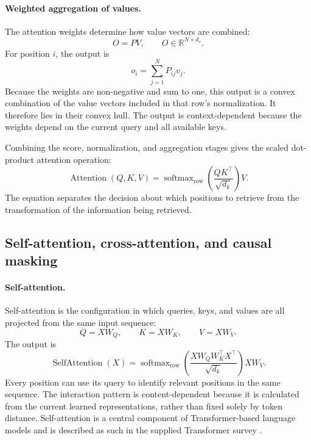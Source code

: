 \paragraph{Weighted aggregation of values.}
The attention weights determine how value vectors are combined:
\begin{equation}
    O=PV,
    \qquad
    O\in\mathbb{R}^{N\times d_v}.
    \label{eq:attn-value-aggregation}
\end{equation}
For position \(i\), the output is
\begin{equation}
    o_i=\sum_{j=1}^{N}P_{ij}v_j.
    \label{eq:attn-token-aggregation}
\end{equation}
Because the weights are non-negative and sum to one, this output is a
convex combination of the value vectors included in that row's
normalization. It therefore lies in their convex hull. The output is
context-dependent because the weights depend on the current query and all
available keys.

Combining the score, normalization, and aggregation stages gives the
scaled dot-product attention operation:
\begin{equation}
    \boxed{
    \operatorname{Attention}(Q,K,V)
    =
    \operatorname{softmax}_{\mathrm{row}}
    \left(
        \frac{QK^\top}{\sqrt{d_k}}
    \right)V
    }.
    \label{eq:attn-scaled-dot-product}
\end{equation}
The equation separates the decision about which positions to retrieve from
the transformation of the information being retrieved.

\subsection{Self-attention, cross-attention, and causal masking}
\label{subsec:attn-self-cross-causal}

\paragraph{Self-attention.}
Self-attention is the configuration in which queries, keys, and values are
all projected from the same input sequence:
\begin{equation}
    Q=XW_Q,\qquad
    K=XW_K,\qquad
    V=XW_V.
    \label{eq:attn-self-qkv}
\end{equation}
The output is
\begin{equation}
    \operatorname{SelfAttention}(X)
    =
    \operatorname{softmax}_{\mathrm{row}}
    \left(
        \frac{XW_QW_K^\top X^\top}{\sqrt{d_k}}
    \right)XW_V.
    \label{eq:attn-self-attention}
\end{equation}
Every position can use its query to identify relevant positions in the same
sequence. The interaction pattern is content-dependent because it is
calculated from the current learned representations, rather than fixed
solely by token distance. Self-attention is a central component of
Transformer-based language models and is described as such in the supplied
Transformer survey \parencite{ansar2024transformers}.


